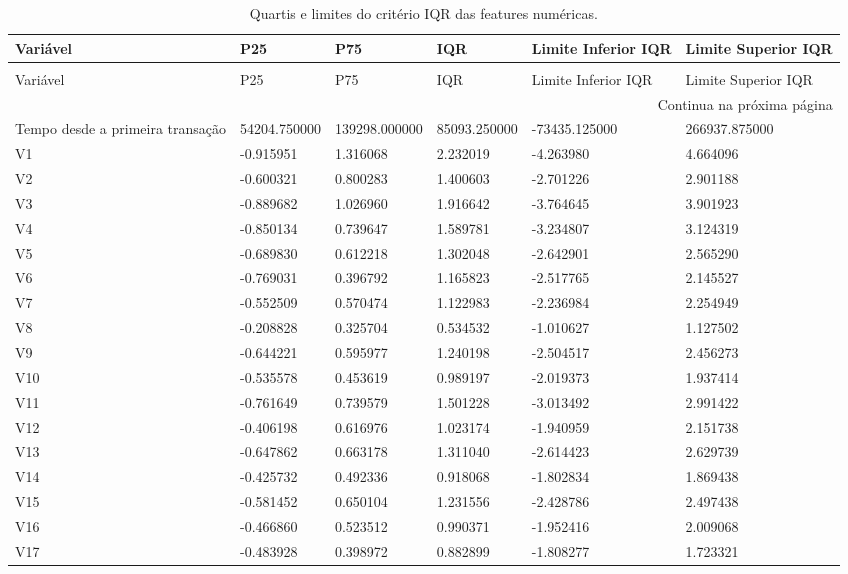 \begin{longtable}{llllll}
\caption{Quartis e limites do critério IQR das features numéricas.} \label{tab:iqr-quartis-limites} \\
\toprule
Variável & P25 & P75 & IQR & Limite Inferior IQR & Limite Superior IQR \\
\midrule
\endfirsthead
\caption[]{Quartis e limites do critério IQR das features numéricas.} \\
\toprule
Variável & P25 & P75 & IQR & Limite Inferior IQR & Limite Superior IQR \\
\midrule
\endhead
\midrule
\multicolumn{6}{r}{Continua na próxima página} \\
\midrule
\endfoot
\bottomrule
\endlastfoot
Tempo desde a primeira transação & 54204.750000 & 139298.000000 & 85093.250000 & -73435.125000 & 266937.875000 \\
V1 & -0.915951 & 1.316068 & 2.232019 & -4.263980 & 4.664096 \\
V2 & -0.600321 & 0.800283 & 1.400603 & -2.701226 & 2.901188 \\
V3 & -0.889682 & 1.026960 & 1.916642 & -3.764645 & 3.901923 \\
V4 & -0.850134 & 0.739647 & 1.589781 & -3.234807 & 3.124319 \\
V5 & -0.689830 & 0.612218 & 1.302048 & -2.642901 & 2.565290 \\
V6 & -0.769031 & 0.396792 & 1.165823 & -2.517765 & 2.145527 \\
V7 & -0.552509 & 0.570474 & 1.122983 & -2.236984 & 2.254949 \\
V8 & -0.208828 & 0.325704 & 0.534532 & -1.010627 & 1.127502 \\
V9 & -0.644221 & 0.595977 & 1.240198 & -2.504517 & 2.456273 \\
V10 & -0.535578 & 0.453619 & 0.989197 & -2.019373 & 1.937414 \\
V11 & -0.761649 & 0.739579 & 1.501228 & -3.013492 & 2.991422 \\
V12 & -0.406198 & 0.616976 & 1.023174 & -1.940959 & 2.151738 \\
V13 & -0.647862 & 0.663178 & 1.311040 & -2.614423 & 2.629739 \\
V14 & -0.425732 & 0.492336 & 0.918068 & -1.802834 & 1.869438 \\
V15 & -0.581452 & 0.650104 & 1.231556 & -2.428786 & 2.497438 \\
V16 & -0.466860 & 0.523512 & 0.990371 & -1.952416 & 2.009068 \\
V17 & -0.483928 & 0.398972 & 0.882899 & -1.808277 & 1.723321 \\

\end{longtable}
